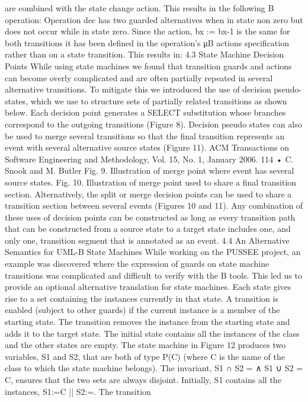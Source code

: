 are combined with the state change action. This results in the following B
operation:
Operation dec has two guarded alternatives when in state non zero but does
not occur while in state zero. Since the action, bx := bx-1 is the same for both
transitions it has been defined in the operation’s μB actions specification rather
than on a state transition. This results in:
4.3 State Machine Decision Points
While using state machines we found that transition guards and actions can become overly complicated and are often partially repeated in several alternative
transitions. To mitigate this we introduced the use of decision pseudo-states,
which we use to structure sets of partially related transitions as shown below.
Each decision point generates a SELECT substitution whose branches correspond
to the outgoing transitions (Figure 8).
Decision pseudo states can also be used to merge several transitions so that
the final transition represents an event with several alternative source states
(Figure 11).
ACM Transactions on Software Engineering and Methodology, Vol. 15, No. 1, January 2006.
114 • C. Snook and M. Butler
Fig. 9. Illustration of merge point where event has several source states.
Fig. 10. Illustration of merge point used to share a final transition section.
Alternatively, the split or merge decision points can be used to share a transition section between several events (Figures 10 and 11).
Any combination of these uses of decision points can be constructed as long
as every transition path that can be constructed from a source state to a target
state includes one, and only one, transition segment that is annotated as an
event.
4.4 An Alternative Semantics for UML-B State Machines
While working on the PUSSEE project, an example was discovered where the
expression of guards on state machine transitions was complicated and difficult to verify with the B tools. This led us to provide an optional alternative
translation for state machines. Each state gives rise to a set containing the instances currently in that state. A transition is enabled (subject to other guards)
if the current instance is a member of the starting state. The transition removes
the instance from the starting state and adds it to the target state. The initial
state contains all the instances of the class and the other states are empty. The
state machine in Figure 12 produces two variables, S1 and S2, that are both of
type P(C) (where C is the name of the class to which the state machine belongs).
The invariant, S1 ∩ S2 = {} ∧ S1 ∪ S2 = C, ensures that the two sets are always
disjoint. Initially, S1 contains all the instances, S1:=C || S2:={}. The transition
